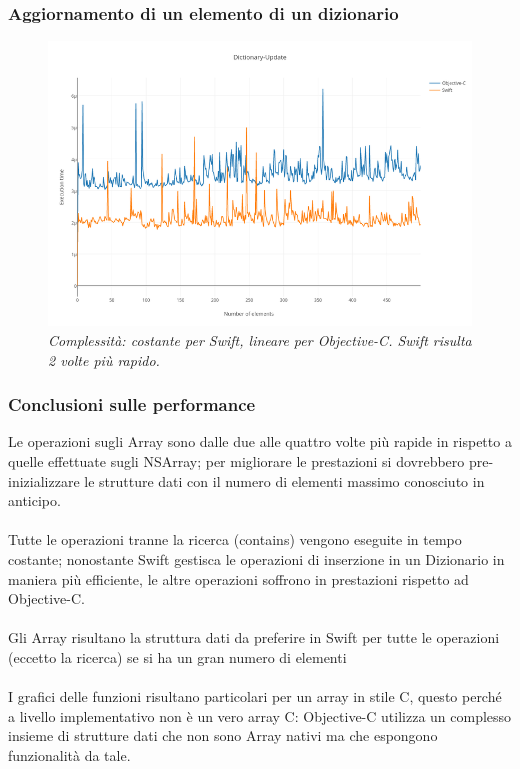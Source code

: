 \subsubsection{Aggiornamento di un elemento di un dizionario}
\begin{figure}[H]
      \centering
      \includegraphics[scale=0.50]{immagini/dictionary_update.png}
            \vspace{0.8cm}
            \caption{\textit{Complessità: costante per Swift, lineare per Objective-C. Swift risulta 2 volte più rapido.}}
\end{figure}
\subsubsection{Conclusioni sulle performance}
Le operazioni sugli Array sono dalle due alle quattro volte più rapide in rispetto a quelle effettuate sugli NSArray; per migliorare le prestazioni si dovrebbero pre-inizializzare le strutture dati con il numero di elementi massimo conosciuto in anticipo.\\\\Tutte le operazioni tranne la ricerca (contains) vengono eseguite in tempo costante; nonostante Swift gestisca le operazioni di inserzione in un Dizionario in maniera più efficiente, le altre operazioni soffrono in prestazioni rispetto ad Objective-C.\\
\\Gli Array risultano la struttura dati da preferire in Swift per tutte le operazioni (eccetto la ricerca) se si ha un gran numero di elementi\\\\
I grafici delle funzioni risultano particolari per un array in stile C, questo perché a livello implementativo non è un vero array C: Objective-C utilizza un complesso insieme di strutture dati che non sono Array nativi ma che espongono funzionalità da tale.
    
    
    
    


